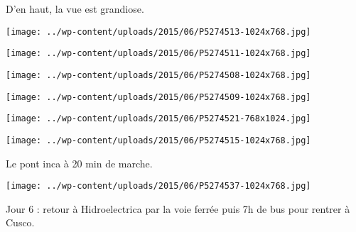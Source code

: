 D'en haut, la vue est grandiose.
\begin{center} \texttt{[image: ../wp-content/uploads/2015/06/P5274513-1024x768.jpg]} \end{center}
\begin{center} \texttt{[image: ../wp-content/uploads/2015/06/P5274511-1024x768.jpg]} \end{center}

\begin{center} \texttt{[image: ../wp-content/uploads/2015/06/P5274508-1024x768.jpg]} \end{center}
\begin{center} \texttt{[image: ../wp-content/uploads/2015/06/P5274509-1024x768.jpg]} \end{center}

\begin{center} \texttt{[image: ../wp-content/uploads/2015/06/P5274521-768x1024.jpg]} \end{center}
\begin{center} \texttt{[image: ../wp-content/uploads/2015/06/P5274515-1024x768.jpg]} \end{center}
\pagebreak

Le pont inca à 20 min de marche. 
\begin{center} \texttt{[image: ../wp-content/uploads/2015/06/P5274537-1024x768.jpg]} \end{center}

Jour 6 : retour à Hidroelectrica par la voie ferrée puis 7h de bus pour rentrer à Cusco.

